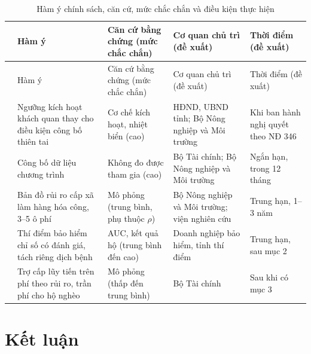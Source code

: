 \documentclass[12pt,a4paper]{article}
\begin{document}
\begingroup\footnotesize
\begin{longtable}{@{}>{\raggedright\arraybackslash}p{0.5cm}>{\raggedright\arraybackslash}p{5.4cm}>{\raggedright\arraybackslash}p{2.8cm}>{\raggedright\arraybackslash}p{2.5cm}>{\raggedright\arraybackslash}p{2.9cm}@{}}
\caption{Hàm ý chính sách, căn cứ, mức chắc chắn và điều kiện thực hiện}\label{tab:policy}\\
\toprule
 & Hàm ý & Căn cứ bằng chứng (mức chắc chắn) & Cơ quan chủ trì (đề xuất) & Thời điểm (đề xuất) \\
\midrule\endfirsthead
\toprule  & Hàm ý & Căn cứ bằng chứng (mức chắc chắn) & Cơ quan chủ trì (đề xuất) & Thời điểm (đề xuất) \\ \midrule\endhead
\bottomrule\endfoot
1 & Ngưỡng kích hoạt khách quan thay cho điều kiện công bố thiên tai & Cơ chế kích hoạt, nhiệt biển (cao) & HĐND, UBND tỉnh; Bộ Nông nghiệp và Môi trường & Khi ban hành nghị quyết theo NĐ 346 \\
2 & Công bố dữ liệu chương trình & Không đo được tham gia (cao) & Bộ Tài chính; Bộ Nông nghiệp và Môi trường & Ngắn hạn, trong 12 tháng \\
3 & Bản đồ rủi ro cấp xã làm hàng hóa công, 3--5 ô phí & Mô phỏng (trung bình, phụ thuộc $\rho$) & Bộ Nông nghiệp và Môi trường; viện nghiên cứu & Trung hạn, 1--3 năm \\
4 & Thí điểm bảo hiểm chỉ số có đánh giá, tách riêng dịch bệnh & AUC, kết quả hộ (trung bình đến cao) & Doanh nghiệp bảo hiểm, tỉnh thí điểm & Trung hạn, sau mục 2 \\
5 & Trợ cấp lũy tiến trên phí theo rủi ro, trần phí cho hộ nghèo & Mô phỏng (thấp đến trung bình) & Bộ Tài chính & Sau khi có mục 3 \\
\end{longtable}
\endgroup
{}

\section{Kết luận}
\label{sec:conclusion}
\end{document}
